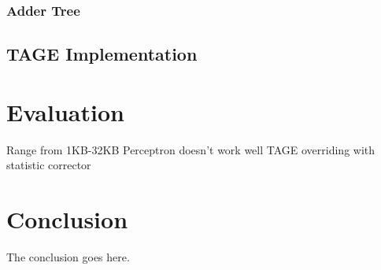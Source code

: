 \documentclass[conference]{IEEEtran}
\begin{document}
\subsubsection{Adder Tree}
\label{sec:fpga:perceptron:adder}


\subsection{TAGE Implementation}
\label{sec:fpga:tage}






\section{Evaluation}
\label{sec:eval}
Range from 1KB-32KB
Perceptron doesn't work well
TAGE overriding with statistic corrector


\section{Conclusion}
The conclusion goes here.












\end{document}
